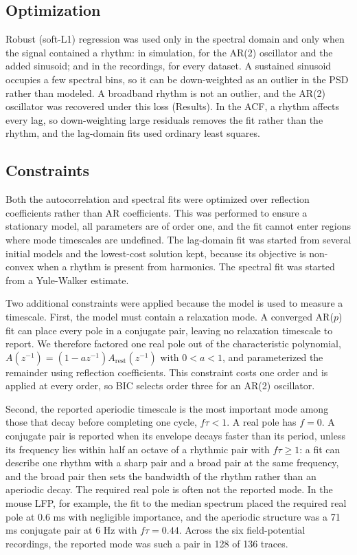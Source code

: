 \documentclass[pdflatex,lineno,sn-nature]{sn-jnl}
\theoremstyle{thmstyleone}
\theoremstyle{thmstyletwo}
\theoremstyle{thmstylethree}
\begin{document}
\subsection{Optimization}

Robust (soft-L1) regression was used only in the spectral domain and only when the signal contained a rhythm: in simulation, for the AR(2) oscillator and the added sinusoid; and in the recordings, for every dataset. A sustained sinusoid occupies a few spectral bins, so it can be down-weighted as an outlier in the PSD rather than modeled. A broadband rhythm is not an outlier, and the AR(2) oscillator was recovered under this loss (Results). In the ACF, a rhythm affects every lag, so down-weighting large residuals removes the fit rather than the rhythm, and the lag-domain fits used ordinary least squares.

\subsection{Constraints}

Both the autocorrelation and spectral fits were optimized over reflection coefficients rather than AR coefficients. This was performed to ensure a stationary model, all parameters are of order one, and the fit cannot enter regions where mode timescales are undefined. The lag-domain fit was started from several initial models and the lowest-cost solution kept, because its objective is non-convex when a rhythm is present from harmonics. The spectral fit was started from a Yule-Walker estimate.

Two additional constraints were applied because the model is used to measure a timescale. First, the model must contain a relaxation mode. A converged AR($p$) fit can place every pole in a conjugate pair, leaving no relaxation timescale to report. We therefore factored one real pole out of the characteristic polynomial, $A(z^{-1}) = (1 - a z^{-1})A_{\mathrm{rest}}(z^{-1})$ with $0 < a < 1$, and parameterized the remainder using reflection coefficients. This constraint costs one order and is applied at every order, so BIC selects order three for an AR(2) oscillator.

Second, the reported aperiodic timescale is the most important mode among those that decay before completing one cycle, $f\tau < 1$. A real pole has $f = 0$. A conjugate pair is reported when its envelope decays faster than its period, unless its frequency lies within half an octave of a rhythmic pair with $f\tau \ge 1$: a fit can describe one rhythm with a sharp pair and a broad pair at the same frequency, and the broad pair then sets the bandwidth of the rhythm rather than an aperiodic decay. The required real pole is often not the reported mode. In the mouse LFP, for example, the fit to the median spectrum placed the required real pole at 0.6 ms with negligible importance, and the aperiodic structure was a 71 ms conjugate pair at 6 Hz with $f\tau = 0.44$. Across the six field-potential recordings, the reported mode was such a pair in 128 of 136 traces.
\end{document}
